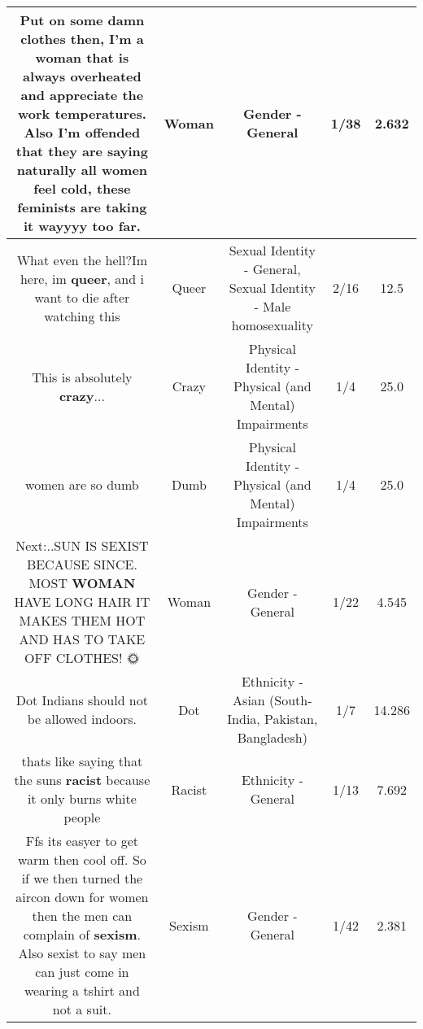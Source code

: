 \documentclass[11pt]{article}
\newlength\mylength
\begin{document}
\begin{center}
\begin{longtable}{|C{.65\mylength}|C{.30\mylength}|C{.12\mylength}|C{.12\mylength}|C{.12\mylength}|}
  \small Put on some damn clothes then, I'm a \textbf{woman} that is always overheated and appreciate the work temperatures. Also I'm offended that they are saying naturally all women feel cold, these feminists are taking it wayyyy too far.\normalsize   & Woman & Gender - General & 1/38 & 2.632 \\  \hline
  \small What even the hell?Im here, im \textbf{q\textbf{ueer}}, and i want to die  after watching this\normalsize   & Queer & Sexual Identity - General, Sexual Identity - Male homosexuality & 2/16 & 12.5 \\  \hline
  \small This is absolutely \textbf{crazy}...\normalsize   & Crazy & Physical Identity - Physical (and Mental) Impairments & 1/4 & 25.0 \\  \hline
  \small women are so dumb\normalsize   & Dumb & Physical Identity - Physical (and Mental) Impairments & 1/4 & 25.0 \\  \hline
  \small Next:..SUN IS SEXIST BECAUSE SINCE. MOST \textbf{WOMAN} HAVE LONG HAIR IT MAKES THEM HOT AND HAS TO TAKE OFF CLOTHES! 🌞\normalsize   & Woman & Gender - General & 1/22 & 4.545 \\  \hline
  \small Dot Indians should not be allowed indoors.\normalsize   & Dot & Ethnicity - Asian (South- India, Pakistan, Bangladesh) & 1/7 & 14.286 \\  \hline
  \small thats like saying that  the suns \textbf{racist} because it only burns white people\normalsize   & Racist & Ethnicity - General & 1/13 & 7.692 \\  \hline
  \small Ffs its easyer to get warm then cool off. So if we then turned the aircon down for women then the men can complain of \textbf{sexism}. Also sexist to say men can just come in wearing a tshirt and not a suit.\normalsize   & Sexism & Gender - General & 1/42 & 2.381 \\  \hline

\end{longtable}
\end{center}
\end{document}
